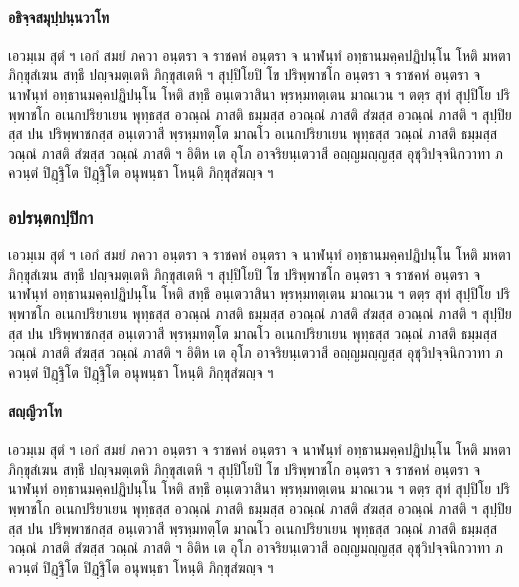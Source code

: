\documentclass[
]{book}
\begin{document}
\hypertarget{uxe2duxe18uxe34uxe08uxe3auxe08uxe2auxe21uxe38uxe1buxe3auxe1buxe19uxe3auxe19uxe27uxe32uxe42uxe17}{%
\paragraph{อธิจฺจสมุปฺปนฺนวาโท}\label{uxe2duxe18uxe34uxe08uxe3auxe08uxe2auxe21uxe38uxe1buxe3auxe1buxe19uxe3auxe19uxe27uxe32uxe42uxe17}}

เอวมฺเม สุตํ ฯ เอกํ สมยํ ภควา อนฺตรา จ ราชคหํ อนฺตรา จ นาฬนฺทํ อทฺธานมคฺคปฏิปนฺโน โหติ มหตา ภิกฺขุสํเฆน สทฺธึ ปญฺจมตฺเตหิ ภิกฺขุสเตหิ ฯ สุปฺปิโยปิ โข ปริพฺพาชโก อนฺตรา จ ราชคหํ อนฺตรา จ นาฬนฺทํ อทฺธานมคฺคปฏิปนฺโน โหติ สทฺธึ อนฺเตวาสินา พฺรหฺมทตฺเตน มาณเวน ฯ ตตฺร สุทํ สุปฺปิโย ปริพฺพาชโก อเนกปริยาเยน พุทฺธสฺส อวณฺณํ ภาสติ ธมฺมสฺส อวณฺณํ ภาสติ สํฆสฺส อวณฺณํ ภาสติ ฯ สุปฺปิยสฺส ปน ปริพฺพาชกสฺส อนฺเตวาสี พฺรหฺมทตฺโต มาณโว อเนกปริยาเยน พุทฺธสฺส วณฺณํ ภาสติ ธมฺมสฺส วณฺณํ ภาสติ สํฆสฺส วณฺณํ ภาสติ ฯ อิติห เต อุโภ อาจริยนฺเตวาสี อญฺญมญฺญสฺส อุชุวิปจฺจนิกวาทา ภควนฺตํ ปิฏฺฐิโต ปิฏฺฐิโต อนุพนฺธา โหนฺติ ภิกฺขุสํฆญฺจ ฯ

\hypertarget{uxe2duxe1buxe23uxe19uxe3auxe15uxe01uxe1buxe3auxe1buxe34uxe01uxe32}{%
\subsubsection{อปรนฺตกปฺปิกา}\label{uxe2duxe1buxe23uxe19uxe3auxe15uxe01uxe1buxe3auxe1buxe34uxe01uxe32}}

เอวมฺเม สุตํ ฯ เอกํ สมยํ ภควา อนฺตรา จ ราชคหํ อนฺตรา จ นาฬนฺทํ อทฺธานมคฺคปฏิปนฺโน โหติ มหตา ภิกฺขุสํเฆน สทฺธึ ปญฺจมตฺเตหิ ภิกฺขุสเตหิ ฯ สุปฺปิโยปิ โข ปริพฺพาชโก อนฺตรา จ ราชคหํ อนฺตรา จ นาฬนฺทํ อทฺธานมคฺคปฏิปนฺโน โหติ สทฺธึ อนฺเตวาสินา พฺรหฺมทตฺเตน มาณเวน ฯ ตตฺร สุทํ สุปฺปิโย ปริพฺพาชโก อเนกปริยาเยน พุทฺธสฺส อวณฺณํ ภาสติ ธมฺมสฺส อวณฺณํ ภาสติ สํฆสฺส อวณฺณํ ภาสติ ฯ สุปฺปิยสฺส ปน ปริพฺพาชกสฺส อนฺเตวาสี พฺรหฺมทตฺโต มาณโว อเนกปริยาเยน พุทฺธสฺส วณฺณํ ภาสติ ธมฺมสฺส วณฺณํ ภาสติ สํฆสฺส วณฺณํ ภาสติ ฯ อิติห เต อุโภ อาจริยนฺเตวาสี อญฺญมญฺญสฺส อุชุวิปจฺจนิกวาทา ภควนฺตํ ปิฏฺฐิโต ปิฏฺฐิโต อนุพนฺธา โหนฺติ ภิกฺขุสํฆญฺจ ฯ

\hypertarget{uxe2auxe0duxe3auxe0duxe35uxe27uxe32uxe42uxe17}{%
\paragraph{สญฺญีวาโท}\label{uxe2auxe0duxe3auxe0duxe35uxe27uxe32uxe42uxe17}}

เอวมฺเม สุตํ ฯ เอกํ สมยํ ภควา อนฺตรา จ ราชคหํ อนฺตรา จ นาฬนฺทํ อทฺธานมคฺคปฏิปนฺโน โหติ มหตา ภิกฺขุสํเฆน สทฺธึ ปญฺจมตฺเตหิ ภิกฺขุสเตหิ ฯ สุปฺปิโยปิ โข ปริพฺพาชโก อนฺตรา จ ราชคหํ อนฺตรา จ นาฬนฺทํ อทฺธานมคฺคปฏิปนฺโน โหติ สทฺธึ อนฺเตวาสินา พฺรหฺมทตฺเตน มาณเวน ฯ ตตฺร สุทํ สุปฺปิโย ปริพฺพาชโก อเนกปริยาเยน พุทฺธสฺส อวณฺณํ ภาสติ ธมฺมสฺส อวณฺณํ ภาสติ สํฆสฺส อวณฺณํ ภาสติ ฯ สุปฺปิยสฺส ปน ปริพฺพาชกสฺส อนฺเตวาสี พฺรหฺมทตฺโต มาณโว อเนกปริยาเยน พุทฺธสฺส วณฺณํ ภาสติ ธมฺมสฺส วณฺณํ ภาสติ สํฆสฺส วณฺณํ ภาสติ ฯ อิติห เต อุโภ อาจริยนฺเตวาสี อญฺญมญฺญสฺส อุชุวิปจฺจนิกวาทา ภควนฺตํ ปิฏฺฐิโต ปิฏฺฐิโต อนุพนฺธา โหนฺติ ภิกฺขุสํฆญฺจ ฯ
\end{document}
